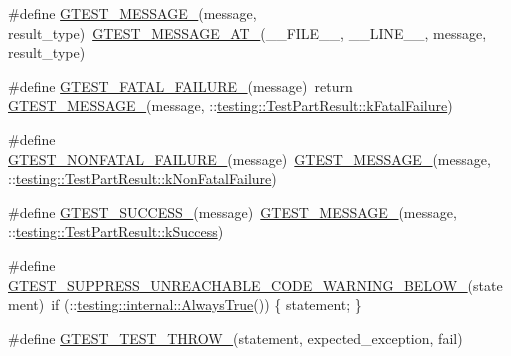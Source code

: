 \begin{DoxyCompactItemize}
\item 
\#define \hyperlink{fused-src_2gtest_2gtest_8h_a94c73d5368ec946bc354d0992ad00810}{G\-T\-E\-S\-T\-\_\-\-M\-E\-S\-S\-A\-G\-E\-\_\-}(message, result\-\_\-type)~\hyperlink{gtest-internal_8h_a8d70025c45a47a493780746dfd66d565}{G\-T\-E\-S\-T\-\_\-\-M\-E\-S\-S\-A\-G\-E\-\_\-\-A\-T\-\_\-}(\-\_\-\-\_\-\-F\-I\-L\-E\-\_\-\-\_\-, \-\_\-\-\_\-\-L\-I\-N\-E\-\_\-\-\_\-, message, result\-\_\-type)
\item 
\#define \hyperlink{fused-src_2gtest_2gtest_8h_a0f9a4c3ea82cc7bf4478eaffdc168358}{G\-T\-E\-S\-T\-\_\-\-F\-A\-T\-A\-L\-\_\-\-F\-A\-I\-L\-U\-R\-E\-\_\-}(message)~return \hyperlink{gtest-internal_8h_a94c73d5368ec946bc354d0992ad00810}{G\-T\-E\-S\-T\-\_\-\-M\-E\-S\-S\-A\-G\-E\-\_\-}(message, \-::\hyperlink{classtesting_1_1_test_part_result_a65ae656b33fdfdfffaf34858778a52d5a7d1d53c4de784e24c5c2efbe14af6786}{testing\-::\-Test\-Part\-Result\-::k\-Fatal\-Failure})
\item 
\#define \hyperlink{fused-src_2gtest_2gtest_8h_a6cb7482cfa03661a91c698eb5895f642}{G\-T\-E\-S\-T\-\_\-\-N\-O\-N\-F\-A\-T\-A\-L\-\_\-\-F\-A\-I\-L\-U\-R\-E\-\_\-}(message)~\hyperlink{gtest-internal_8h_a94c73d5368ec946bc354d0992ad00810}{G\-T\-E\-S\-T\-\_\-\-M\-E\-S\-S\-A\-G\-E\-\_\-}(message, \-::\hyperlink{classtesting_1_1_test_part_result_a65ae656b33fdfdfffaf34858778a52d5ade889093a860e9b21e703be6226d7cec}{testing\-::\-Test\-Part\-Result\-::k\-Non\-Fatal\-Failure})
\item 
\#define \hyperlink{fused-src_2gtest_2gtest_8h_abe012b550eb3807e8c49f7e161bd1567}{G\-T\-E\-S\-T\-\_\-\-S\-U\-C\-C\-E\-S\-S\-\_\-}(message)~\hyperlink{gtest-internal_8h_a94c73d5368ec946bc354d0992ad00810}{G\-T\-E\-S\-T\-\_\-\-M\-E\-S\-S\-A\-G\-E\-\_\-}(message, \-::\hyperlink{classtesting_1_1_test_part_result_a65ae656b33fdfdfffaf34858778a52d5a2f9a7e9f6c2df7b0d2212add7ce0a8be}{testing\-::\-Test\-Part\-Result\-::k\-Success})
\item 
\#define \hyperlink{fused-src_2gtest_2gtest_8h_a2e66f7dfc5cb87e0fa0289f653173c69}{G\-T\-E\-S\-T\-\_\-\-S\-U\-P\-P\-R\-E\-S\-S\-\_\-\-U\-N\-R\-E\-A\-C\-H\-A\-B\-L\-E\-\_\-\-C\-O\-D\-E\-\_\-\-W\-A\-R\-N\-I\-N\-G\-\_\-\-B\-E\-L\-O\-W\-\_\-}(statement)~if (\-::\hyperlink{namespacetesting_1_1internal_a922c9da63cd4bf94fc473b9ecac76414}{testing\-::internal\-::\-Always\-True}()) \{ statement; \}
\item 
\#define \hyperlink{fused-src_2gtest_2gtest_8h_a3f71db93eaf30b0cfca9612b9ac32106}{G\-T\-E\-S\-T\-\_\-\-T\-E\-S\-T\-\_\-\-T\-H\-R\-O\-W\-\_\-}(statement, expected\-\_\-exception, fail)
\item 

\end{DoxyCompactItemize}
